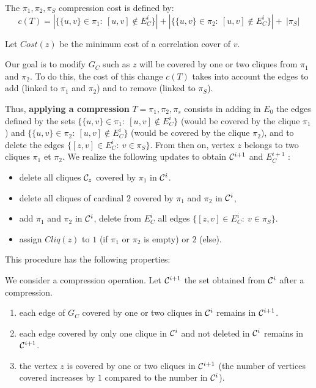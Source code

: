 The $\pi_{1},\pi_{2},\pi_{S}$ compression cost is defined by:
$$c(T) = | \{\{u,v\} \in \pi_{1}:~[u,v]\not\in E_{C}^{i}\}| + |\{\{u,v\} \in \pi_2:~[u,v]\not\in E_{C}^{i}\}| +~ |\pi_S| $$



Let $Cost(z)$ be the minimum cost of a correlation cover of $v$. 

Our goal is to modify $G_C$ such as $z$ will be covered by one or two cliques from $\pi_1$ and $\pi_2$.
To do this, the cost of this change $ c(T) $ takes into account the edges to add (linked to $\pi_1$ and $\pi_2$) and to remove (linked to $\pi_S$).


Thus, {\bf applying a compression} $T=\pi_1,\pi_2,\pi_s$ consists in adding in $E_0$ the edges defined by the sets $\{\{u,v\} \in \pi_1:~[u,v]\not\in E_{C}^{i}\}$ (would be covered by the clique $\pi_1$) and $\{\{u,v\} \in \pi_2:~[u,v]\not\in  E_{C}^{i}\}$ (would be covered by the clique $\pi_2$), and to delete the edges $\{[z,v] \in  E_{C}^{i}:~v\in \pi_S\}$. 
From then on, vertex $z$ belongs to two cliques $\pi_1$ et $\pi_2$. 
We realize the following updates to obtain ${\cal C}^{i+1}$ and $E_{C}^{i+1}$ :

\begin{itemize} 
	\item delete all cliques ${\cal C}_z$ covered by $\pi_1$ in  ${\cal C}^{i}$.
	\item delete all cliques of cardinal $2$ covered by  $\pi_1$ and  $\pi_2$ in ${\cal C}^{i}$,        
	\item add $\pi_1$ and $\pi_2$ in ${\cal C}^{i}$, delete from $E^{i}_C$ all edges $\{[z,v] \in E_C^{i}:~v\in \pi_S\}$. 
	\item assign $Cliq(z)$ to $1$ (if $\pi_1$ or $\pi_2$ is empty) or $2$ (else).
\end{itemize}

This procedure has the following properties:
\begin{property}
We consider a compression operation.
Let ${\cal C}^{i+1}$ the set obtained from ${\cal C}^{i}$ after a compression.
\begin{enumerate}
\item each edge of $G_{C}$ covered by one or two cliques in ${\cal C}^{i}$ remains in ${\cal C}^{i+1}$.
\item each edge covered by only one clique in ${\cal C}^{i}$ and not deleted in ${\cal C}^{i}$  remains in ${\cal C}^{i+1}$.
\item the vertex $z$ is covered by one or two cliques in ${\cal C}^{i+1}$ (the number of vertices covered increases by $1$ compared to the number in ${\cal C}^{i}$).
\end{enumerate}
\end{property}

